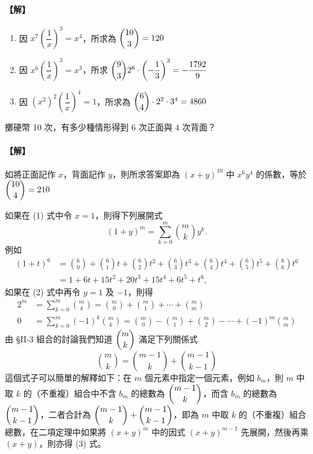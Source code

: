 \paragraph{【解】}
\begin{enumerate}[label=(\roman*)]
  \item 因 $x^7 \left(\dfrac{1}{x}\right)^3 = x^4$，所求為 $\dbinom{10}{3} = 120$
  \item 因 $x^6 \left(\dfrac{1}{x}\right)^3 = x^3$，所求 $\dbinom{9}{3} 2^6 \cdot \left(-\dfrac{1}{3}\right)^3 = -\dfrac{1792}{9}$
  \item 因 $(x^2)^2 \left(\dfrac{1}{x}\right)^4 = 1$，所求為 $\dbinom{6}{4} \cdot 2^2 \cdot 3^4 = 4860$
\end{enumerate}

\medskip
\begin{example}\label{ex:b5-2-21}
擲硬幣 10 次，有多少種情形得到 6 次正面與 4 次背面？
\end{example}
\paragraph{【解】}
如將正面記作 $x$，背面記作 $y$，則所求答案即為 $(x + y)^{10}$ 中 $x^6 y^4$ 的係數，等於 $\dbinom{10}{4} = 210$

\bigskip
如果在 (1) 式中令 $x = 1$，則得下列展開式
\begin{equation}
(1 + y)^m = \sum_{k=0}^m \binom{m}{k} y^k. \label{eq:b5-2-4-2}\tag{2}
\end{equation}
例如
\begin{align*}
(1 + t)^6 &= \binom{6}{0} + \binom{6}{1} t + \binom{6}{2} t^2 + \binom{6}{3} t^3 + \binom{6}{4} t^4 + \binom{6}{5} t^5 + \binom{6}{6} t^6 \\
&= 1 + 6t + 15t^2 + 20t^3 + 15t^4 + 6t^5 + t^6,
\end{align*}
如果在 (2) 式中再令 $y = 1$ 及 $-1$，則得
\begin{align*}
2^m &= \sum_{k=0}^m \binom{m}{k} = \binom{m}{0} + \binom{m}{1} + \dotsb + \binom{m}{m} \\
0 &= \sum_{k=0}^m (-1)^k \binom{m}{k} = \binom{m}{0} - \binom{m}{1} + \binom{m}{2} - \dotsb + (-1)^m \binom{m}{m}
\end{align*}
由 \S II-3 組合的討論我們知道 $\dbinom{m}{k}$ 滿足下列關係式
\begin{equation}
\binom{m}{k} = \binom{m-1}{k} + \binom{m-1}{k-1} \label{eq:b5-2-4-3}\tag{3}
\end{equation}
這個式子可以簡單的解釋如下：在 $m$ 個元素中指定一個元素，例如 $b_m$，則 $m$ 中取 $k$ 的（不重複）組合中不含 $b_m$ 的總數為 $\dbinom{m-1}{k}$，而含 $b_m$ 的總數為 $\dbinom{m-1}{k-1}$，二者合計為 $\dbinom{m-1}{k} + \dbinom{m-1}{k-1}$，即為 $m$ 中取 $k$ 的（不重複）組合總數，在二項定理中如果將 $(x+y)^m$ 中的因式 $(x+y)^{m-1}$ 先展開，然後再乘 $(x+y)$，則亦得 (3) 式。

